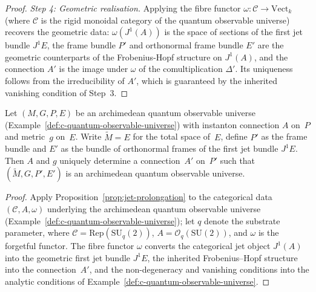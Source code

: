 \begin{proof}
\emph{Step 4: Geometric realisation.}\;
Applying the fibre functor $\omega\colon \mathcal{C} \to \mathrm{Vect}_k$
(where $\mathcal{C}$ is the rigid monoidal category of the quantum
observable universe)
recovers the geometric data: $\omega(J^1(A))$ is the space of sections of the
first jet bundle $J^1 E$, the frame bundle $P'$ and orthonormal frame bundle
$E'$ are the geometric counterparts of the Frobenius-Hopf structure on
$J^1(A)$, and the connection $A'$ is the image under $\omega$ of the
comultiplication $\Delta'$.  Its uniqueness follows from the irreducibility
of $A'$, which is guaranteed by the inherited vanishing condition of
Step~3.
\end{proof}

\begin{corollary}
\label{cor:jet-prolongation-C}
Let $(M, G, P, E)$ be an archimedean quantum observable universe
(Example~\ref{def:c-quantum-observable-universe}) with instanton connection
$A$ on~$P$ and metric~$g$ on~$E$.  Write $\widetilde{M} = E$ for the total
space of~$E$, define $P'$ as the frame bundle and $E'$ as the bundle of
orthonormal frames of the first jet bundle $J^1 E$.  Then $A$ and $g$
uniquely determine a connection~$A'$ on~$P'$ such that
$(\widetilde{M}, G, P', E')$ is an archimedean quantum observable universe.
\end{corollary}

\begin{proof}
Apply Proposition~\ref{prop:jet-prolongation} to the categorical data
$(\mathcal{C}, A, \omega)$ underlying the archimedean quantum
observable universe (Example~\ref{def:c-quantum-observable-universe});
let $q$ denote the substrate parameter,
where $\mathcal{C} = \mathrm{Rep}(\mathrm{SU}_{q}(2))$,
$A = \mathcal{O}_q(\mathrm{SU}(2))$, and $\omega$ is the forgetful
functor.  The fibre functor $\omega$ converts the categorical jet object
$J^1(A)$ into the geometric first jet bundle $J^1 E$, the inherited
Frobenius--Hopf structure into the connection~$A'$, and the
non-degeneracy and vanishing conditions into the analytic conditions of
Example~\ref{def:c-quantum-observable-universe}.
\end{proof}

